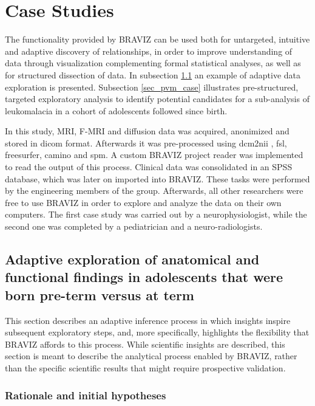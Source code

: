 \documentclass[twocolumn]{svjour3}
\begin{document}
\section{Case Studies}

The functionality provided by BRAVIZ can be used both for untargeted, intuitive and adaptive discovery of relationships, in order to improve understanding of data through visualization complementing formal statistical analyses, as well as for structured dissection of data. In subsection \ref{sec_case_cyril} an example of adaptive data exploration is presented. Subsection \ref{sec_pvm_case} illustrates pre-structured, targeted exploratory analysis to identify potential candidates for a sub-analysis of leukomalacia in a cohort of adolescents followed since birth. 

In this study, MRI, F-MRI and diffusion data was acquired, anonimized and stored in dicom format. Afterwards it was pre-processed using dcm2nii \cite{}, fsl\cite{}, freesurfer\cite{}, camino\cite{} and spm\cite{}. A custom BRAVIZ project reader was implemented to read the output of this process. 
Clinical data was consolidated in an SPSS database, which was later on imported into BRAVIZ. These tasks were performed by the engineering members of the group. Afterwards, all other researchers were free to use BRAVIZ in order to explore and analyze the data on their own computers. The first case study was carried out by a neurophysiologist, while the second one was completed by a  pediatrician and a neuro-radiologists. 

 
\subsection{Adaptive exploration of anatomical and functional findings in adolescents that were born pre-term versus at term}
\label{sec_case_cyril}

This section describes an adaptive inference process in which insights inspire subsequent exploratory steps, and, more specifically, highlights the flexibility that BRAVIZ affords to this process. While scientific insights are described, this section is meant to describe the analytical process enabled by BRAVIZ, rather than the specific scientific results that might require prospective validation.

\subsubsection{Rationale and initial hypotheses}
\end{document}
